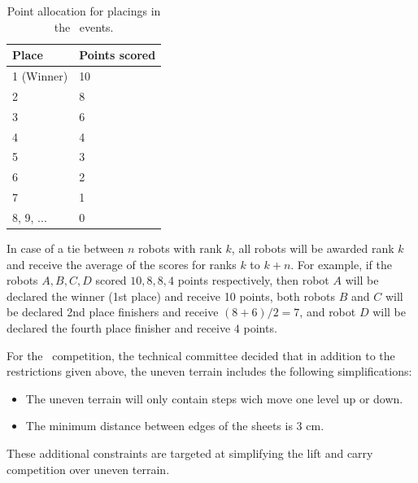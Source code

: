 \documentclass[12pt]{hurocup}
\begin{document}
\begin{lawlist}[LC]
\begin{itemize}
    \begin{table}
      \begin{center}
        \begin{tabular}{l|l}
          \hline
          Place & Points scored \\
          \hline
          1 (Winner) & 10 \\
          2          & 8 \\
          3          & 6 \\
          4          & 4 \\
          5          & 3 \\
          6          & 2 \\
          7          & 1 \\
          8, 9, ...  & 0 \\
          \hline
        \end{tabular}
      \end{center}
      \caption{Point allocation for placings in the \HuroCup\ events.}
      \label{point-allocation}
    \end{table}
  \end{itemize}

\item In case of a tie between $n$ robots with rank $k$, all robots
  will be awarded rank $k$ and receive the average of the scores for
  ranks $k$ to $k+n$.  For example, if the robots $A,B,C,D$ scored
  $10, 8, 8, 4$ points respectively, then robot $A$ will be declared
  the winner (1st place) and receive 10 points, both robots $B$ and
  $C$ will be declared 2nd place finishers and receive $(8+6)/2=7$,
  and robot $D$ will be declared the fourth place finisher and receive
  $4$ points.

\end{lawlist}

\begin{decisions}
\item For the \thisyear\ competition, the technical committee decided
  that in addition to the restrictions given above, the uneven terrain
  includes the following simplifications:
\begin{itemize}
\item The uneven terrain will only contain steps wich move one level
  up or down.
\item The minimum distance between edges of the sheets is 3 cm.
\end{itemize}
These additional constraints are targeted at simplifying the lift and
carry competition over uneven terrain.

\end{decisions}
\end{document}
